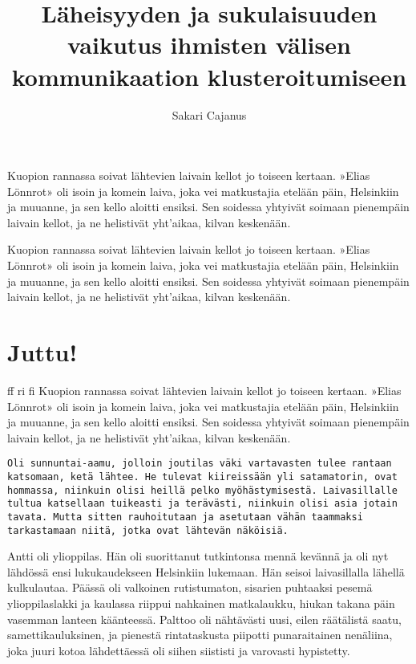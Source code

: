 \documentclass[a4paper,finnish,12pt]{scrartcl}
\author{Sakari Cajanus}
\title{Läheisyyden ja sukulaisuuden vaikutus ihmisten välisen kommunikaation klusteroitumiseen}{Och samma på English}
\begin{document}
\maketitlepage
\newpage

\begin{abstractpage}
Kuopion rannassa soivat lähtevien laivain kellot jo toiseen kertaan.
»Elias Lönnrot» oli isoin ja komein laiva, joka vei matkustajia etelään
päin, Helsinkiin ja muuanne, ja sen kello aloitti ensiksi. Sen soidessa
yhtyivät soimaan pienempäin laivain kellot, ja ne helistivät yht'aikaa,
kilvan keskenään.
\end{abstractpage}
\begin{abstractpage@en}
Kuopion rannassa soivat lähtevien laivain kellot jo toiseen kertaan.
»Elias Lönnrot» oli isoin ja komein laiva, joka vei matkustajia etelään
päin, Helsinkiin ja muuanne, ja sen kello aloitti ensiksi. Sen soidessa
yhtyivät soimaan pienempäin laivain kellot, ja ne helistivät yht'aikaa,
kilvan keskenään.
\end{abstractpage@en}
\section{Juttu!}
ff
ri
fi
Kuopion rannassa soivat lähtevien laivain kellot jo toiseen kertaan.
»Elias Lönnrot» oli isoin ja komein laiva, joka vei matkustajia etelään
päin, Helsinkiin ja muuanne, ja sen kello aloitti ensiksi. Sen soidessa
yhtyivät soimaan pienempäin laivain kellot, ja ne helistivät yht'aikaa,
kilvan keskenään.

\begin{verbatim}
Oli sunnuntai-aamu, jolloin joutilas väki vartavasten tulee rantaan
katsomaan, ketä lähtee. He tulevat kiireissään yli satamatorin, ovat
hommassa, niinkuin olisi heillä pelko myöhästymisestä. Laivasillalle
tultua katsellaan tuikeasti ja terävästi, niinkuin olisi asia jotain
tavata. Mutta sitten rauhoitutaan ja asetutaan vähän taammaksi
tarkastamaan niitä, jotka ovat lähtevän näköisiä.
\end{verbatim}

Antti oli ylioppilas. Hän oli suorittanut tutkintonsa mennä kevännä ja
oli nyt lähdössä ensi lukukaudekseen Helsinkiin lukemaan. Hän seisoi
laivasillalla lähellä kulkulautaa. Päässä oli valkoinen rutistumaton,
sisarien puhtaaksi pesemä ylioppilaslakki ja kaulassa riippui nahkainen
matkalaukku, hiukan takana päin vasemman lanteen käänteessä. Palttoo
oli nähtävästi uusi, eilen räätälistä saatu, samettikauluksinen, ja
pienestä rintataskusta piipotti punaraitainen nenäliina, joka juuri
kotoa lähdettäessä oli siihen siististi ja varovasti hypistetty.
\end{document}
